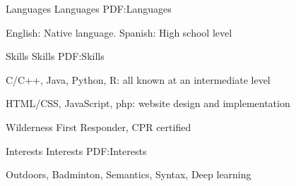 \documentclass[letterpaper,MMMyyyy,nonstopmode,14pt]{simpleresumecv}
\begin{document}
\begin{Body}

{
%	
%
%
}

\Section
{Languages}
{Languages}
{PDF:Languages}

\BulletItem
English: Native language.
\BulletItem
Spanish: High school level


\Section
{Skills }
{Skills}
{PDF:Skills}

\BulletItem
C/C++, Java, Python, R: all known at an intermediate level

\BulletItem
HTML/CSS, JavaScript, php: website design and implementation 

\BulletItem 
Wilderness First Responder, CPR certified


\Section
{Interests}
{Interests}
{PDF:Interests}

\Entry
Outdoors,
Badminton,
Semantics, 
Syntax, 
Deep learning


{
%
}


\end{Body}

\end{document}
